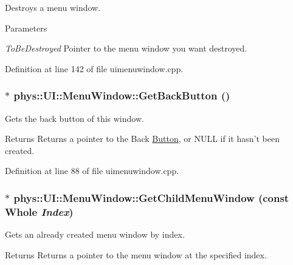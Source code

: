 Destroys a menu window. 


\begin{DoxyParams}{Parameters}
\item[{\em ToBeDestroyed}]Pointer to the menu window you want destroyed. \end{DoxyParams}


Definition at line 142 of file uimenuwindow.cpp.

\hypertarget{classphys_1_1UI_1_1MenuWindow_a7c286758bac0e21154f41a56d9da8c08}{
\subsubsection[{GetBackButton}]{ $\ast$ phys::UI::MenuWindow::GetBackButton ()}}
\label{d4/d07/classphys_1_1UI_1_1MenuWindow_a7c286758bac0e21154f41a56d9da8c08}


Gets the back button of this window. 

\begin{DoxyReturn}{Returns}
Returns a pointer to the Back \hyperlink{classphys_1_1UI_1_1Button}{Button}, or NULL if it hasn't been created. 
\end{DoxyReturn}


Definition at line 88 of file uimenuwindow.cpp.

\hypertarget{classphys_1_1UI_1_1MenuWindow_a528d6397f8799219793978c70a26c22c}{
\subsubsection[{GetChildMenuWindow}]{ $\ast$ phys::UI::MenuWindow::GetChildMenuWindow (const {\bf Whole} {\em Index})}}
\label{d4/d07/classphys_1_1UI_1_1MenuWindow_a528d6397f8799219793978c70a26c22c}


Gets an already created menu window by index. 

\begin{DoxyReturn}{Returns}
Returns a pointer to the menu window at the specified index. 
\end{DoxyReturn}


